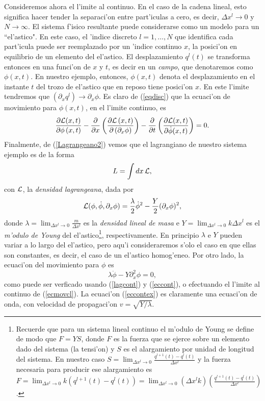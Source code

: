 Consideremos ahora el l'imite al continuo. En el caso de la cadena lineal, esto
significa hacer tender la separaci'on entre part'iculas a cero, es decir,
$\Delta x^{l}\rightarrow 0$ y $N\rightarrow\infty$. El sistema f'isico
resultante puede considerarse como un modelo para un ``el'astico". En este caso,
el 'indice discreto $l=1,\dots,N$ que identifica cada part'icula puede ser
reemplazado por un 'indice continuo $x$, la posici'on en equilibrio de un
elemento del el'astico. El desplazamiento $q^l(t)$ se transforma entonces en una
funci'on de $x$ y $t$, es decir en un {\em campo}, que denotaremos como
$\phi(x,t)$. En nuestro ejemplo, entonces, $\phi(x,t)$ denota el desplazamiento
en el instante $t$ del trozo de el'astico que en reposo tiene posici'on $x$. En
este l'imite tendremos que $(\partial_x q^l)\rightarrow \partial_x\phi$.
Es claro de (\ref{eqdisc}) que la ecuaci'on de movimiento para $\phi(x,t)$, en
el l'imite continuo, es
\begin{equation}
\frac{\partial{\cal L}(x,t) }{\partial \phi\left(
x,t\right) }-\frac{\partial}{\partial x}\left( \frac{\partial{\cal L}\left(
x,t\right) }{\partial\left( \partial_{x}\phi\right) }\right) -\frac{\partial
}{\partial t}\left( \frac{\partial{\cal L}(x,t) }{\partial
\dot{\phi}(x,t) }\right)  =0.\label{eccont}
\end{equation}
Finalmente, de (\ref{Lagrangeano2}) vemos que el lagrangiano de nuestro
sistema ejemplo es de la forma
\begin{equation}
L=\int dx\,{\cal L},
\end{equation}
con ${\cal L}$, la {\em densidad lagrangeana}, dada por
\begin{equation}
{\cal
L}(\phi,\dot{\phi},\partial_x\phi)=\frac{\lambda}{2}\dot{\phi}^2-\frac{Y}{2}
(\partial_x\phi)^2 , \label{lagcont}
\end{equation}
donde $\lambda=\lim_{\Delta x^l\rightarrow 0}\frac{m}{\Delta x^l}$ es la {\em
densidad lineal de masa} e $Y=\lim_{\Delta x^l\rightarrow 0} k\Delta x^l$ es el
{\em m'odulo de Young} del el'astico\footnote{Recuerde que para un sistema
lineal continuo el m'odulo de Young se define de modo que $F=YS$, donde $F$ es
la fuerza que se ejerce sobre un elemento dado del sistema (la tensi'on) y $S$
es el alargamiento por unidad de longitud del sistema. En nuestro caso
$S=\lim_{\Delta x^l\rightarrow 0}\frac{q^{l+1}(t) -q^{l}(t) }{\Delta x^{l}} $ y
la fuerza necesaria para producir ese alargamiento es $F=\lim_{\Delta
x^l\rightarrow 0}k\left(q^{l+1}(t) -q^{l}(t)\right) =\lim_{\Delta x^l\rightarrow
0}\left( \Delta x^{l}k\right) \left( \frac{q^{l+1}(t)-q^{l}(t) }{\Delta
x^{l}}\right)$.}, respectivamente. En principio $\lambda$ e $Y$ pueden variar a
lo largo del el'astico, pero aqu'i consideraremos s'olo el caso en que ellas son
constantes, es decir, el caso de un el'astico homog'eneo. Por otro lado, la
ecuaci'on del movimiento para $\phi$ es
\begin{equation}
\lambda\ddot{\phi}-Y\partial^2_x\phi=0, \label{eccontex}
\end{equation}
como puede ser verficado usando (\ref{lagcont}) y (\ref{eccont}), o efectuando
el l'imite al continuo de (\ref{ecmovcl}). La ecuaci'on (\ref{eccontex}) es
claramente una ecuaci'on de onda, con velocidad de propagaci'on
$v=\sqrt{Y/\lambda}$.

